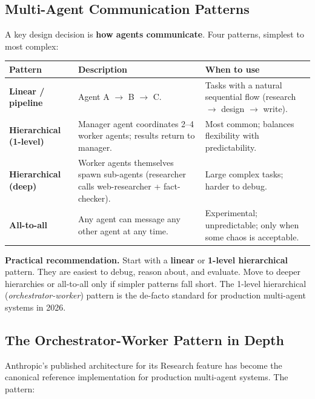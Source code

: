\documentclass[a4paper,11pt]{article}
\begin{document}
\subsection{Multi-Agent Communication Patterns}

A key design decision is \textbf{how agents communicate}. Four
patterns, simplest to most complex:

\begin{center}\small
\begin{tabular}{p{3.2cm} p{4.6cm} p{4.8cm}}
  \toprule
  \textbf{Pattern} & \textbf{Description} & \textbf{When to use} \\
  \midrule
  \textbf{Linear / pipeline} &
    Agent A $\to$ B $\to$ C. &
    Tasks with a natural sequential flow (research $\to$ design $\to$ write). \\
  \addlinespace
  \textbf{Hierarchical (1-level)} &
    Manager agent coordinates 2–4 worker agents; results return to manager. &
    Most common; balances flexibility with predictability. \\
  \addlinespace
  \textbf{Hierarchical (deep)} &
    Worker agents themselves spawn sub-agents (researcher calls web-researcher + fact-checker). &
    Large complex tasks; harder to debug. \\
  \addlinespace
  \textbf{All-to-all} &
    Any agent can message any other agent at any time. &
    Experimental; unpredictable; only when some chaos is acceptable. \\
  \bottomrule
\end{tabular}
\end{center}

\begin{ambercallout}
\textbf{Practical recommendation.}
Start with a \textbf{linear} or \textbf{1-level hierarchical}
pattern. They are easiest to debug, reason about, and evaluate. Move
to deeper hierarchies or all-to-all only if simpler patterns fall
short. The 1-level hierarchical (\textit{orchestrator-worker})
pattern is the de-facto standard for production multi-agent systems
in 2026.
\end{ambercallout}

\subsection{The Orchestrator-Worker Pattern in Depth}

Anthropic's published architecture for its Research feature has
become the canonical reference implementation for production
multi-agent systems. The pattern:
\end{document}
